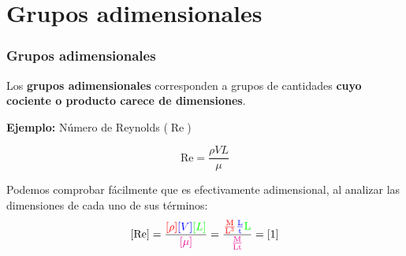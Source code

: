 \documentclass[t]{beamer}
\begin{document}
\section{Grupos adimensionales}
\begin{frame}
\frametitle{Grupos adimensionales}
Los \textbf{grupos adimensionales} corresponden a grupos de cantidades \textbf{cuyo cociente o producto carece de dimensiones}.

\vspace{0.5cm}

\textbf{Ejemplo:} Número de Reynolds ($\operatorname{Re}$)


$$\mathrm{Re} = \frac{\rho V L}{\mu}$$

Podemos comprobar fácilmente que  es efectivamente adimensional, al analizar las dimensiones de cada uno de sus términos:
$$[\operatorname{Re}]=\frac{\color{red}{[\rho]}\color{blue}{[V]}\color{green}{[L]}}{\color{magenta}{[\mu]}}=\mathrm{\frac{\color{red}{\frac{M}{L^{3}}}\color{blue}{\frac{L}{t}}\color{green}{L}}{\color{magenta}{\frac{M}{L t}}}}=[1]$$
\end{frame}


\end{document}
